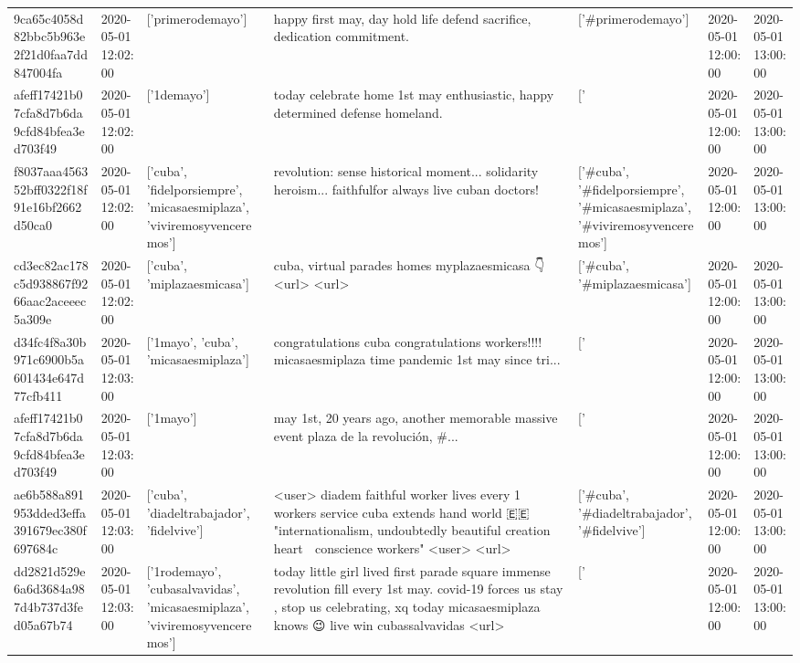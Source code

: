 \begin{tabular}{lllllll}
9ca65c4058d82bbc5b963e2f21d0faa7dd847004fa & 2020-05-01 12:02:00 & ['primerodemayo'] & happy first may, day hold life defend sacrifice, dedication commitment. & ['#primerodemayo'] & 2020-05-01 12:00:00 & 2020-05-01 13:00:00 \\
afeff17421b07cfa8d7b6da9cfd84bfea3ed703f49 & 2020-05-01 12:02:00 & ['1demayo'] & today celebrate home 1st may enthusiastic, happy determined defense homeland. & ['#1demayo'] & 2020-05-01 12:00:00 & 2020-05-01 13:00:00 \\
f8037aaa456352bff0322f18f91e16bf2662d50ca0 & 2020-05-01 12:02:00 & ['cuba', 'fidelporsiempre', 'micasaesmiplaza', 'viviremosyvenceremos'] & revolution: sense historical moment... solidarity heroism... faithfulfor always live cuban doctors! & ['#cuba', '#fidelporsiempre', '#micasaesmiplaza', '#viviremosyvenceremos'] & 2020-05-01 12:00:00 & 2020-05-01 13:00:00 \\
cd3ec82ac178c5d938867f9266aac2aceeec5a309e & 2020-05-01 12:02:00 & ['cuba', 'miplazaesmicasa'] & cuba, virtual parades homes myplazaesmicasa 👇<url> <url> & ['#cuba', '#miplazaesmicasa'] & 2020-05-01 12:00:00 & 2020-05-01 13:00:00 \\
d34fc4f8a30b971c6900b5a601434e647d77cfb411 & 2020-05-01 12:03:00 & ['1mayo', 'cuba', 'micasaesmiplaza'] & congratulations cuba congratulations workers!!!! micasaesmiplaza time pandemic 1st may since tri... & ['#1mayo', '#cuba', '#micasaesmiplaza'] & 2020-05-01 12:00:00 & 2020-05-01 13:00:00 \\
afeff17421b07cfa8d7b6da9cfd84bfea3ed703f49 & 2020-05-01 12:03:00 & ['1mayo'] & may 1st, 20 years ago, another memorable massive event plaza de la revolución, \#... & ['#1mayo'] & 2020-05-01 12:00:00 & 2020-05-01 13:00:00 \\
ae6b588a891953dded3effa391679ec380f697684c & 2020-05-01 12:03:00 & ['cuba', 'diadeltrabajador', 'fidelvive'] & <user> diadem faithful worker lives every 1 workers service cuba extends hand world 🇪🇪 "internationalism, undoubtedly beautiful creation heart 💖 conscience workers" <user> <url> & ['#cuba', '#diadeltrabajador', '#fidelvive'] & 2020-05-01 12:00:00 & 2020-05-01 13:00:00 \\
dd2821d529e6a6d3684a987d4b737d3fed05a67b74 & 2020-05-01 12:03:00 & ['1rodemayo', 'cubasalvavidas', 'micasaesmiplaza', 'viviremosyvenceremos'] & today little girl lived first parade square immense revolution fill every 1st may. covid-19 forces us stay , stop us celebrating, xq today micasaesmiplaza knows 😉 live win cubassalvavidas <url> & ['#1rodemayo', '#cubasalvavidas', '#micasaesmiplaza', '#viviremosyvenceremos'] & 2020-05-01 12:00:00 & 2020-05-01 13:00:00 \\

\end{tabular}
